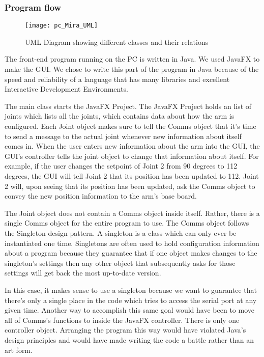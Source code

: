 \subsubsection{Program flow}

\begin{figure}[H]
\centering
\texttt{[image: pc\_Mira\_UML]}
\caption{UML Diagram showing different classes and their relations}
\label{fig:Functional_Block_Diagram}
\end{figure}

\noindent The front-end program running on the PC is written in Java. We used JavaFX to make the GUI. We chose to write this part of the program in Java because of the speed and reliability of a language that has many libraries and excellent Interactive Development Environments.  

\noindent The main class starts the JavaFX Project. The JavaFX Project holds an list of joints which lists all the joints, which contains data about how the arm is configured. Each Joint object makes sure to tell the Comms object that it's time to send a message to the actual joint whenever new information about itself comes in. When the user enters new information about the arm into the GUI, the GUI's controller tells the joint object to change that information about itself. For example, if the user changes the setpoint of Joint 2 from 90 degrees to 112 degrees, the GUI will tell Joint 2 that its position has been updated to 112. Joint 2 will, upon seeing that its position has been updated, ask the Comms object to convey the new position information to the arm's base board.

\noindent The Joint object does not contain a Comms object inside itself. Rather, there is a single Comms object for the entire program to use. The Comms object follows the Singleton design pattern. A singleton is a class which can only ever be instantiated one time. Singletons are often used to hold configuration information about a program because they guarantee that if one object makes changes to the singleton's settings then any other object that subsequently asks for those settings will get back the most up-to-date version.

\noindent In this case, it makes sense to use a singleton because we want to guarantee that there's only a single place in the code which tries to access the serial port at any given time. Another way to accomplish this same goal would have been to move all of Comms's functions to inside the JavaFX controller. There is only one controller object. Arranging the program this way would have violated Java's design principles and would have made writing the code a battle rather than an art form. %


